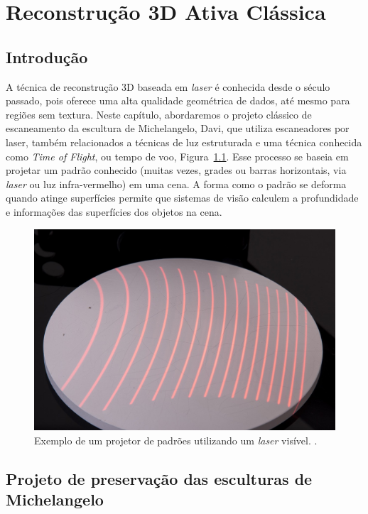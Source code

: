 \chapter{Reconstrução 3D Ativa Clássica}\label{cap:laser}

\section*{Introdução}

A técnica de reconstrução 3D baseada em \emph{laser} 
é conhecida desde o século
passado, pois oferece uma alta qualidade geométrica de dados, até mesmo para
regiões sem textura.  Neste capítulo, abordaremos o projeto clássico de escaneamento da
escultura de Michelangelo, Davi, que utiliza escaneadores 
por laser, também relacionados a técnicas de luz estruturada e
uma técnica conhecida como \emph{Time of Flight}, ou tempo de voo,
Figura~\ref{fig:luzestruturada}. Esse processo se baseia em projetar um padrão
conhecido (muitas vezes, grades ou barras horizontais, via \emph{laser} ou luz infra-vermelho) em uma
cena. A forma como o padrão se deforma quando atinge superfícies permite que
sistemas de visão calculem a profundidade e informações das superfícies dos
objetos na cena.

\begin{figure}[!h]
	\centering
	\includegraphics[width=0.7\linewidth]{figs/luzestruturada.jpg}
	\caption{%
	Exemplo de um projetor de padrões utilizando um \emph{laser} visível.
	\cite{luzEstruturada}.
	}\label{fig:luzestruturada}
\end{figure}

\section{Projeto de preservação das esculturas de Michelangelo}\label{sec:David}


